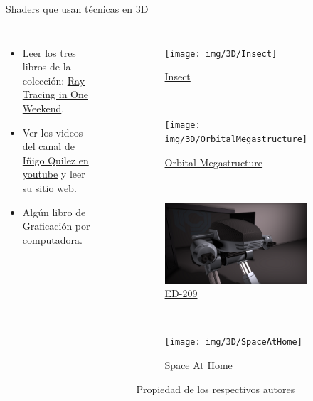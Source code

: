 \begin{frame}{Shaders que usan técnicas en 3D}
\begin{columns}
    \begin{itemize}
         \item Leer los tres libros de la colección: \href{https://raytracing.github.io/}{Ray Tracing in One Weekend}.
         \item Ver los videos del canal de \href{https://www.youtube.com/c/InigoQuilez}{Iñigo Quilez en youtube} y leer su \href{https://iquilezles.org/}{sitio web}.
         \item Algún libro de Graficación por computadora.
     \end{itemize}
\begin{figure}[htp]
 \centering
 \begin{subfigure}[b]{0.42\textwidth}
   \texttt{[image: img/3D/Insect]}
   \caption{\href{https://www.shadertoy.com/view/Mss3zM}{Insect}}
 \end{subfigure}
~
 \begin{subfigure}[b]{0.42\textwidth}
   \texttt{[image: img/3D/OrbitalMegastructure]}
   \caption{\href{https://www.shadertoy.com/view/WlKXzm}{Orbital Megastructure}}
 \end{subfigure}
\\
 \begin{subfigure}[b]{0.42\textwidth}
   \includegraphics[width=\textwidth]{img/3D/ED-209}
   \caption{\href{https://www.shadertoy.com/view/wsGczG}{ED-209}}
 \end{subfigure}
~
 \begin{subfigure}[b]{0.42\textwidth}
   \texttt{[image: img/3D/SpaceAtHome]}
   \caption{\href{https://www.shadertoy.com/view/MXS3zy}{Space At Home}}
 \end{subfigure}
 \caption{Propiedad de los respectivos autores}
\end{figure}
\end{columns}
\end{frame}

